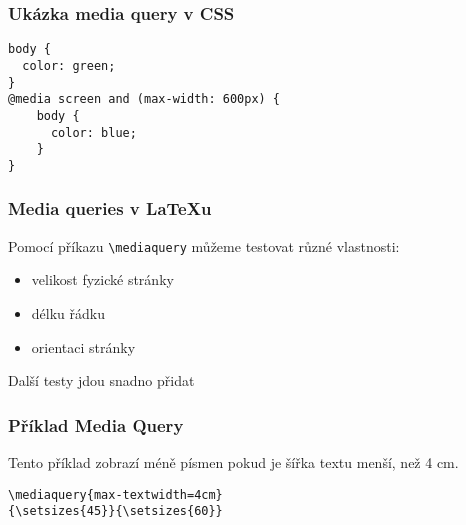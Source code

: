 \begin{frame}[fragile]
\frametitle{Ukázka media query v CSS}
\begin{verbatim}
body {
  color: green;
}
@media screen and (max-width: 600px) {
    body {
      color: blue;
    }
}
\end{verbatim}
          
\end{frame}

\begin{frame}[fragile]
  \frametitle{Media queries v \LaTeX u}
    Pomocí příkazu \verb|\mediaquery| můžeme testovat různé vlastnosti:
  
    \begin{itemize}
  \item velikost fyzické stránky
  \item délku řádku
  \item orientaci stránky
\end{itemize}

Další testy jdou snadno přidat

\end{frame}

\begin{frame}[fragile]

  \frametitle{Příklad Media Query}

  Tento příklad zobrazí méně písmen pokud je šířka textu menší, než 4 cm.

  
\begin{verbatim}
\mediaquery{max-textwidth=4cm}
{\setsizes{45}}{\setsizes{60}}
\end{verbatim}
\begin{columns}
  \begin{column}{0.5\textwidth}
\end{column}
  \begin{column}{0.5\textwidth}
\end{column}
\end{columns}

\end{frame}

